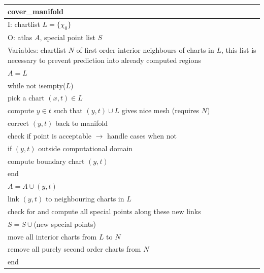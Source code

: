 \documentclass[twoside,draft,a4paper]{article}
\begin{document}
\begin{center}
\begin{tabular}{|p{}|}
\hline
cover\_manifold \\
\hline
I: chartlist $L = \{\chi_0\}$ \\
\hline
O: atlas $A$, special point list $S$ \\
\hline
Variables: chartlist $N$ of first order interior neighbours of charts in $L$, this list is necessary to prevent prediction into already computed regions \\
\hline
$A=L$ \\[0.2ex]
while not isempty($L$) \\
\hspace{2ex} pick a chart $(x,t)\in L$ \\
\hspace{2ex} compute $y\in t$ such that $(y,t)\cup L$ gives nice mesh (requires $N$) \\
\hspace{2ex} correct $(y,t)$ back to manifold \\
\hspace{2ex} check if point is acceptable $\longrightarrow$ handle cases when not \\
\hspace{2ex} if $(y,t)$ outside computational domain \\
\hspace{4ex}  	compute boundary chart $(y,t)$ \\
\hspace{2ex} end \\
\hspace{2ex} $A = A\cup(y,t)$ \\
\hspace{2ex} link $(y,t)$ to neighbouring charts in $L$ \\
\hspace{2ex} check for and compute all special points along these new links \\
\hspace{2ex} $S=S\cup{}$(new special points) \\
\hspace{2ex} move all interior charts from $L$ to $N$ \\
\hspace{2ex} remove all purely second order charts from $N$ \\
end \\
\hline
\end{tabular}
\end{center}
\end{document}
